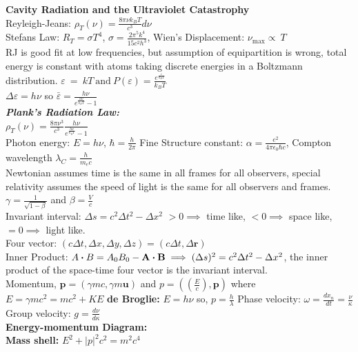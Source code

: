 \documentclass[10pt,landscape,a4paper]{article}
\newcommand{\subs}[1]{\ensuremath{_{\text{#1}}}}
\newcommand{\minititle}[1]{\textbf{#1:}\\}
\renewcommand{\^}[1]{\ensuremath{\hat{#1}}}
\renewcommand{\-}[1]{\text{\sout{\ensuremath{#1}}}}
\begin{document}
	\begin{multicols}{4}
	\textbf{Cavity Radiation and the Ultraviolet Catastrophy}\\
	Reyleigh-Jeans: $ \rho_T(\nu) = \frac{8\pi\nu k_BT}{c^3}d\nu $\\
	Stefans Law: $ R_T = \sigma T^4 $, $ \sigma=\frac{2\pi^5k^4}{15c^2h^3} $, Wien's Displacement: $ \nu\subs{max}\propto~T $\\
	RJ is good fit at low frequencies, but assumption of equipartition is wrong, total energy is constant with atoms taking discrete energies in a Boltzmann distribution. $ \varepsilon ~ = ~ kT ~ \text{and}~P(\varepsilon) = \frac{e^{\frac{\varepsilon} {k_BT}}}{k_BT} $\\
	$ \Delta\varepsilon = h\nu $ so $ \bar{\varepsilon} = \frac{h\nu}{e^{\frac{h\nu}{k_BT}}-1} $\\
	\textbf{\textit{Plank's Radiation Law:}} \\
	$ \rho_T(\nu) = \frac{8\pi\nu^3}{c^3}\frac{h\nu}{e^{\frac{h\nu}{k_BT}}-1} $\\
	Photon energy: $ E = h\nu $, $ \hbar=\frac{h}{2\pi} $ Fine Structure constant: $ \alpha = \frac{e^2}{4\pi\epsilon_0\hbar c} $, Compton wavelength $ \lambda_C = \frac{h}{m_ec} $\\
	Newtonian assumes time is the same in all frames for all observers, special relativity assumes the speed of light is the same for all observers and frames.
	$ \gamma = \frac{1}{\sqrt{1-\beta}} $ and $ \beta=\frac{V}{c} $\\
	Invariant interval: $ \Delta s = c^2\Delta t^2 - \Delta x^2 $ $ >0 \implies $ time like, $ <0\implies $ space like, $ =0 \implies $ light like.\\
	Four vector: $ (c\Delta t,\Delta x,\Delta y,\Delta z)=( c\Delta t,\Delta \textbf{r}) $\\
	Inner Product: $ A\vdot B = A_0B_0 - \textbf{A}\vdot \textbf{B} \implies (\Delta s)^2 = c^2\Delta t^2 - \Delta x^2 $, the inner product of the space-time four vector is the invariant interval.\\
	Momentum, $ \textbf{p} = (\gamma mc, \gamma m\textbf{u}) $ and $ p = (\left(\frac{E}{c}\right),\textbf{p}) $ where $ E = \gamma mc^2 = mc^2 + KE $	
	\textbf{de Broglie:} $ E = h\nu $ so, $ p = \frac{h}{\lambda} $ Phase velocity: $ \omega = \frac{dx_n}{dt}=\frac{\nu}{\kappa} $ Group velocity: $ g = \frac{d\nu}{d\kappa} $ \\
	\minititle{Energy-momentum Diagram}
	\textbf{Mass shell:} $ E^2 + |p|^2c^2 = m^2c^4 $\\

\end{multicols}
\end{document}
